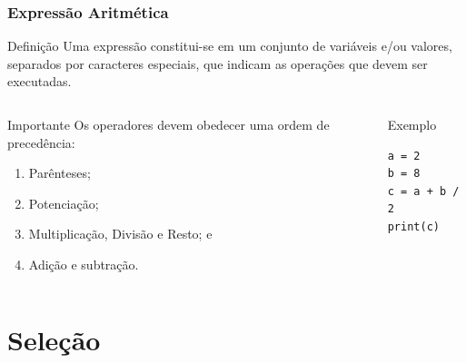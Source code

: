 \documentclass[aspectratio=169]{beamer} %
\begin{document}
\begin{frame}[fragile]
\frametitle{Expressão Aritmética}

\begin{block}{Definição}
Uma expressão constitui-se em um conjunto de variáveis e/ou valores, separados por caracteres especiais, que indicam as operações que devem ser executadas.
\end{block} \vfill

 \begin{columns}[c]

\begin{alertblock}{Importante}
Os operadores devem obedecer uma ordem de precedência:
\begin{enumerate}
	\item Parênteses;
	\item Potenciação;
	\item Multiplicação, Divisão e Resto; e
	\item Adição e subtração.
\end{enumerate}
\end{alertblock} \vfill

\begin{exampleblock}{Exemplo}
	\begin{lstlisting}
a = 2
b = 8
c = a + b / 2
print(c)
	\end{lstlisting}
\end{exampleblock}
\end{columns}
\end{frame}

\section{Seleção}
\end{document}
